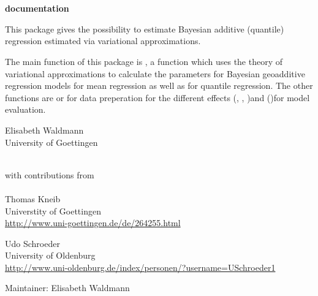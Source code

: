 \documentclass[a4paper]{book}
\begin{document}
\chapter*{}
\begin{center}
{\textbf{\huge \R{} documentation}} \par{}
\par\bigskip{\large \today}
\end{center}
%
\begin{Description}\relax
This package gives the possibility to estimate Bayesian additive (quantile) regression estimated via variational approximations.
\end{Description}
%
\begin{Details}\relax

The main function of this package is , a function which uses the theory of variational approximations to calculate the parameters for Bayesian geoadditive regression models for mean regression as well as for quantile regression. The other functions are or for data preperation for the different effects (, , )and ()for model evaluation.
\end{Details}
%
\begin{Author}\relax
Elisabeth Waldmann \\{}
University of Goettingen \\{}
\\{}

with contributions from\\{}
\\{}
Thomas Kneib\\{}
Universtity of Goettingen\\{}
\url{http://www.uni-goettingen.de/de/264255.html}\\{}

Udo Schroeder\\{}
University of Oldenburg\\{}
\url{http://www.uni-oldenburg.de/index/personen/?username=USchroeder1}\\{}

Maintainer: Elisabeth Waldmann
\end{Author}
\end{document}
